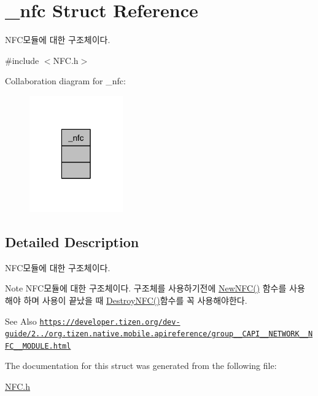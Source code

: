 \hypertarget{struct__nfc}{\section{\-\_\-nfc Struct Reference}
\label{struct__nfc}
}


N\-F\-C모듈에 대한 구조체이다.  




{\ttfamily \#include $<$N\-F\-C.\-h$>$}



Collaboration diagram for \-\_\-nfc\-:
\nopagebreak
\begin{figure}[H]
\begin{center}
\leavevmode
\includegraphics[width=114pt]{d3/d2e/struct__nfc__coll__graph}
\end{center}
\end{figure}


\subsection{Detailed Description}
N\-F\-C모듈에 대한 구조체이다. 

\begin{DoxyNote}{Note}
N\-F\-C모듈에 대한 구조체이다. 구조체를 사용하기전에 \hyperlink{NFC_8h_a03b543f63bf7d41bb184db9209d5cc9c}{New\-N\-F\-C()} 함수를 사용 해야 하며 사용이 끝났을 때 \hyperlink{NFC_8h_a1e5dc8f957d33cd59f30e03f113d63fe}{Destroy\-N\-F\-C()}함수를 꼭 사용해야한다. 
\end{DoxyNote}
\begin{DoxySeeAlso}{See Also}
\href{https://developer.tizen.org/dev-guide/2.3.0/org.tizen.native.mobile.apireference/group__CAPI__NETWORK__NFC__MODULE.html}{\tt https\-://developer.\-tizen.\-org/dev-\/guide/2../org.\-tizen.\-native.\-mobile.\-apireference/group\-\_\-\-\_\-\-C\-A\-P\-I\-\_\-\-\_\-\-N\-E\-T\-W\-O\-R\-K\-\_\-\-\_\-\-N\-F\-C\-\_\-\-\_\-\-M\-O\-D\-U\-L\-E.\-html} 
\end{DoxySeeAlso}


The documentation for this struct was generated from the following file\-:\begin{DoxyCompactItemize}
\item 
\hyperlink{NFC_8h}{N\-F\-C.\-h}\end{DoxyCompactItemize}

